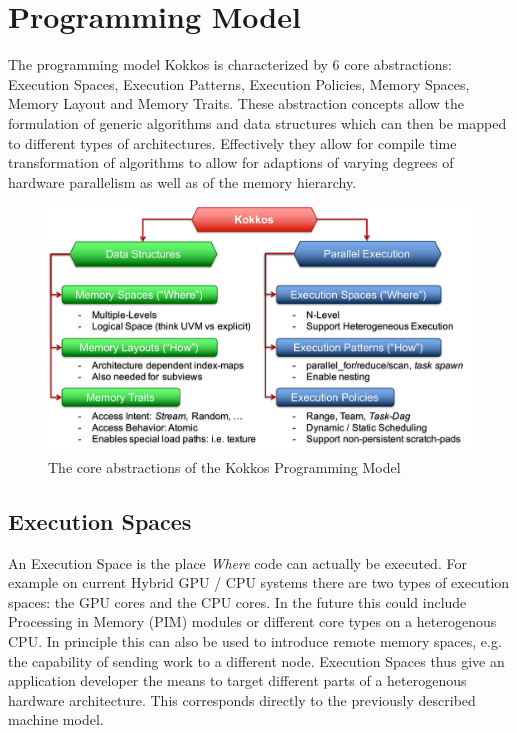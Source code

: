 
\chapter{Programming Model}

The programming model Kokkos is characterized by 6 core abstractions: Execution Spaces, Execution Patterns, Execution Policies, Memory Spaces, Memory Layout and Memory Traits. 
These abstraction concepts allow the formulation of generic algorithms and data structures which can then be mapped to different types of architectures. 
Effectively they allow for compile time transformation of algorithms to allow for adaptions of varying degrees of hardware parallelism as well as of the memory hierarchy. 

\begin{figure}[h]
\begin{center}
\includegraphics[clip, width=\textwidth]{figures/kokkos-abstractions.pdf}
\caption{The core abstractions of the Kokkos Programming Model}
\label{fig:kokkosabstractions}
\end{center}
\end{figure}

\section{Execution Spaces}

An Execution Space is the place {\it Where} code can actually be executed. 
For example on current Hybrid GPU / CPU systems there are two types of execution spaces: the GPU cores and the CPU cores. 
In the future this could include Processing in Memory (PIM) modules or different core types on a heterogenous CPU.
In principle this can also be used to introduce remote memory spaces, e.g. the capability of sending work to a different node.
Execution Spaces thus give an application developer the means to target different parts of a heterogenous hardware architecture.
This corresponds directly to the previously described machine model.

